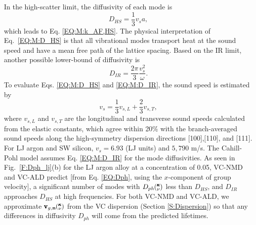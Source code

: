 In the high-scatter limit,\cite{cahill_lattice_1988} 
the diffusivity of each mode is
\begin{equation}\label{EQ:M:D_HS}
D_{HS} = \frac{1}{3} v_s a,
\end{equation}
which leads to Eq. \eqref{EQ:M:k_AF,HS}. 
The physical interpretation of Eq.~\eqref{EQ:M:D_HS} 
is that all vibrational modes transport heat at the sound speed 
and have a mean free path of the lattice spacing. 
Based on the IR limit, another possible lower-bound of 
diffusivity is  
\begin{equation}\label{EQ:M:D_IR}
D_{IR} = \frac{2\pi}{3} \frac{v^2_s}{\omega}. 
\end{equation} 
To evaluate Eqs. \eqref{EQ:M:D_HS} and \eqref{EQ:M:D_IR}, 
the sound speed is estimated by 
\begin{equation}\label{EQ:M:vs}
v_s = \frac{1}{3}v_{s,L} + \frac{2}{3}v_{s,T},
\end{equation}
where $v_{s,L}$ and $v_{s,T}$ are the longitudinal and transverse 
sound speeds calculated from the elastic constants,
\cite{gale_general_2003} which agree within 20$\%$ with the 
branch-averaged sound speeds along the high-symmetry dispersion 
directions [100],[110], and [111]. For LJ argon and SW silicon, 
$v_s = 6.93$ (LJ units) and $5,790$ m/s. 
The Cahill-Pohl model assumes Eq. \eqref{EQ:M:D_IR} for the mode 
diffusivities.\cite{cahill_lattice_1988} 
As seen in Fig.~\ref{F:Dph_lj}(b) for the LJ argon alloy at 
a concentration of 0.05, VC-NMD and VC-ALD predict [from 
Eq. \eqref{EQ:Dph}, using the $x$-component of group velocity], a 
significant number of modes with  
$D_{ph}\mspace{-4.0mu}\left(\mspace{-8.0mu} \begin{smallmatrix}&\pmb{\kappa} \\&\nu\end{smallmatrix} \mspace{-3.0mu}\right)$ less than $D_{HS}$, and $D_{IR}$ approaches $D_{HS}$ at 
high frequencies. For both VC-NMD and VC-ALD, we 
approximate $\pmb{\text{v}}_{g,\mathbf{n}}\mspace{-4.0mu}\left(\mspace{-8.0mu} \begin{smallmatrix}&\pmb{\kappa} \\&\nu\end{smallmatrix} \mspace{-3.0mu}\right)$ from the VC dispersion 
(Section \ref{S:Dispersion}) so that any differences in 
diffusivity $D_{ph}$ will come from the predicted lifetimes.  

